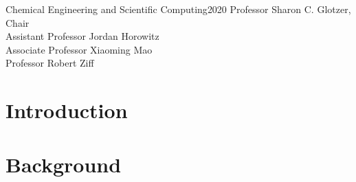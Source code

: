 \documentclass[leqno]{report}
\theoremstyle{plain}
\theoremstyle{definition}
\theoremstyle{remark}
\numberwithin{theorem}{chapter}        %
\begin{document}





{Chemical Engineering and Scientific Computing}{2020}
{ Professor Sharon C. Glotzer, Chair \\
  Assistant Professor Jordan Horowitz \\
  Associate Professor Xiaoming Mao \\
  Professor Robert Ziff }



\initializefrontsections



\setcounter{page}{1}


\startacknowledgementspage



\tableofcontents
\listoffigures
\listoftables

\startabstractpage



\startthechapters


\chapter{Introduction}
\label{ch:intro}


\chapter{Background}
\label{ch:background}

\end{document}
